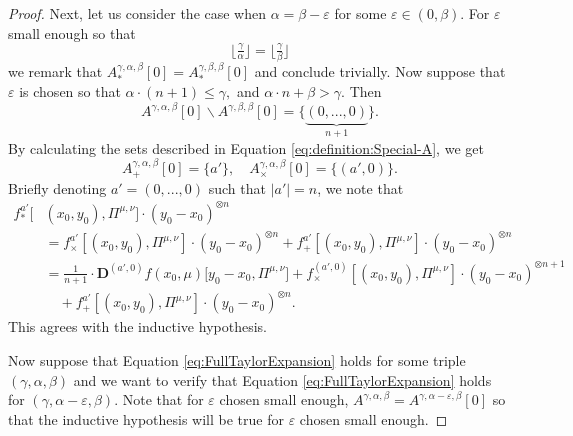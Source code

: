 \documentclass[a4paper,11pt,twoside]{article}
\numberwithin{equation}{section}
\theoremstyle{plain}
\newcommand{\rD}{\mathbf{D}}
\newcommand{\1}{\mathbbm{1}}
\begin{document}
\begin{proof}
		Next, let us consider the case when $\alpha = \beta-\varepsilon$ for some $\varepsilon \in (0, \beta)$. For $\varepsilon$ small enough so that
		\begin{equation*}
			\big\lfloor \tfrac{\gamma}{\alpha} \big\rfloor = \big\lfloor \tfrac{\gamma}{\beta} \big\rfloor
		\end{equation*}
		we remark that $A_{\ast}^{\gamma, \alpha, \beta}[0] = A_{\ast}^{\gamma, \beta, \beta}[0]$ and conclude trivially. Now suppose that $\varepsilon$ is chosen so that $\alpha \cdot(n+1) \leq \gamma,$ and $\alpha \cdot n + \beta > \gamma$. Then 
		\begin{equation*}
			A^{\gamma, \alpha, \beta}[0] \backslash A^{\gamma, \beta, \beta}[0] = \big\{ \underbrace{(0, ..., 0)}_{n+1} \big\}. 
		\end{equation*}
		By calculating the sets described in Equation \eqref{eq:definition:Special-A}, we get
		\begin{equation*}
			A_{+}^{\gamma, \alpha, \beta}[0] = \Big\{ a' \Big\}, 
			\quad
			A_{\times}^{\gamma, \alpha, \beta}[0] = \Big\{ (a', 0) \Big\}. 
		\end{equation*}
		Briefly denoting $a'=(0, ..., 0)$ such that $|a'| = n$, we note that
		\begin{align*}
			f_{\ast}^{a'}[ &(x_0, y_0), \Pi^{\mu, \nu}] \cdot ( y_{0} - x_{0})^{\otimes n}
			\\
			&= 
			f_{\times}^{a'}[ (x_0, y_0), \Pi^{\mu, \nu}] \cdot ( y_{0} - x_{0})^{\otimes n}
			+
			f_{+}^{a'}[ (x_0, y_0), \Pi^{\mu, \nu}] \cdot ( y_{0} - x_{0})^{\otimes n} 
			\\
			&=\frac{1}{n+1} \cdot \rD^{(a',0)} f(x_0, \mu)\big[ y_0-x_0, \Pi^{\mu, \nu}\big]
			+
			f_{\times}^{(a', 0)}[ (x_0, y_0), \Pi^{\mu, \nu}] \cdot ( y_{0} - x_{0})^{\otimes n+1}
			\\
			&\quad +
			f_{+}^{a'}[ (x_0, y_0), \Pi^{\mu, \nu}] \cdot ( y_{0} - x_{0})^{\otimes n} . 
		\end{align*}
		This agrees with the inductive hypothesis. 
		
		Now suppose that Equation \eqref{eq:FullTaylorExpansion} holds for some triple $(\gamma, \alpha, \beta)$ and we want to verify that Equation \eqref{eq:FullTaylorExpansion} holds for $(\gamma, \alpha-\varepsilon, \beta)$. Note that for $\varepsilon$ chosen small enough, $A^{\gamma, \alpha, \beta} = A^{\gamma, \alpha-\varepsilon, \beta}[0]$ so that the inductive hypothesis will be true for $\varepsilon$ chosen small enough. 
		

\end{proof}
\end{document}
